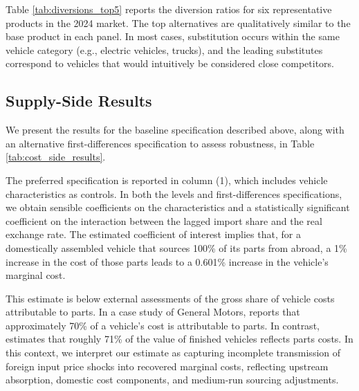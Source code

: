 \documentclass[11pt]{article}
\begin{document}
Table \ref{tab:diversions_top5} reports the diversion ratios for six representative products in the 2024 market. The top alternatives are qualitatively similar to the base product in each panel. In most cases, substitution occurs within the same vehicle category (e.g., electric vehicles, trucks), and the leading substitutes correspond to vehicles that would intuitively be considered close competitors.




\subsection{Supply-Side Results}

We present the results for the baseline specification described above, along with an alternative first-differences specification to assess robustness, in Table \ref{tab:cost_side_results}.





The preferred specification is reported in column (1), which includes vehicle characteristics as controls. In both the levels and first-differences specifications, we obtain sensible coefficients on the characteristics and a statistically significant coefficient on the interaction between the lagged import share and the real exchange rate. The estimated coefficient of interest implies that, for a domestically assembled vehicle that sources 100\% of its parts from abroad, a 1\% increase in the cost of those parts leads to a 0.601\% increase in the vehicle’s marginal cost.

This estimate is below external assessments of the gross share of vehicle costs attributable to parts. In a case study of General Motors, \cite{helper_management_2014} reports that approximately 70\% of a vehicle’s cost is attributable to parts. In contrast, \cite{menk_methodology_2012} estimates that roughly 71\% of the value of finished vehicles reflects parts costs. In this context, we interpret our estimate as capturing incomplete transmission of foreign input price shocks into recovered marginal costs, reflecting upstream absorption, domestic cost components, and medium-run sourcing adjustments.
\end{document}
